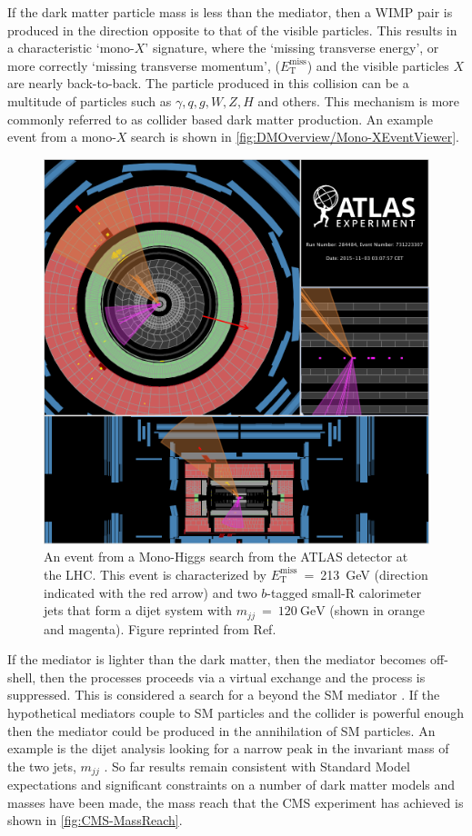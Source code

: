 If the dark matter particle mass is less than the mediator, then a WIMP pair is produced in the direction opposite to that of the visible particles. This results in a characteristic `mono-$X$' signature, where the `missing transverse energy', or more correctly `missing transverse momentum', ($E^{\text{miss}}_\text{T}$) and the visible particles $X$ are nearly back-to-back. The particle produced in this collision can be a multitude of particles such as $\gamma, q, g, W, Z, H$ and others. This mechanism is more commonly referred to as collider based dark matter production. An example event from a mono-$X$ search is shown in \autoref{fig:DMOverview/Mono-XEventViewer}.

\begin{figure}[ht!]
    \centering
    \includegraphics[width=0.65\linewidth]{figures/DMOverview/MonoXEventViewer.png}
    \caption[An event from a Mono-Higgs search from the ATLAS detector at the LHC.]{An event from a Mono-Higgs search from the ATLAS detector at the LHC. This event is characterized by $E^{\text{miss}}_\text{T}$~=~213~GeV (direction indicated with the red arrow) and two $b$-tagged small-R calorimeter jets that form a dijet system with $m_{jj}~=~120~\text{GeV}$ (shown in orange and magenta). Figure reprinted from Ref.~\cite{ATLAS:2016btj}}
    \label{fig:DMOverview/Mono-XEventViewer}
\end{figure}

If the mediator is lighter than the dark matter, then the mediator becomes off-shell, then the processes proceeds via a virtual exchange and the process is suppressed. This is considered a search for a beyond the SM mediator \cite{hteagle:thesis}. If the hypothetical mediators couple to SM particles and the collider is powerful enough then the mediator could be produced in the annihilation of SM particles.  An example is the dijet analysis
looking for a narrow peak in the invariant mass of the two jets, $m_{jj}$ \cite{Penning:2017tmb}.
So far results remain consistent with Standard Model expectations \cite{CMS:2017jdm,ATLAS:2016bek} and significant constraints on a number of dark matter models and masses have been made, the mass reach that the CMS experiment has achieved is shown in \autoref{fig:CMS-MassReach}.

